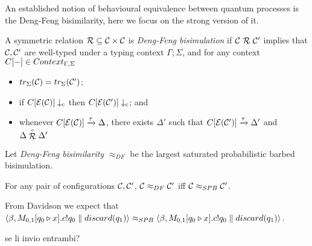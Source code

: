 An established notion of behavioural equivalence between quantum processes is the Deng-Feng bisimilarity, here we focus on the strong version of it.
\begin{definition}
	A symmetric relation $\mathcal{R} \subseteq \mathcal{C} \times \mathcal{C}$ is \emph{Deng-Feng bisimulation} if $\mathcal{C}\ \mathcal{R}\ \mathcal{C}'$ implies that $\mathcal{C}, \mathcal{C}'$ are well-typed under a typing context $\Gamma; \Sigma$, and for any context $C[{-}] \in Context_{\Gamma, \Sigma}$
	\begin{itemize}
		\item $tr_{\Sigma}(\mathcal{C}) = tr_{\Sigma}(\mathcal{C}')$;
		\item if $C[\mathcal{E}(\mathcal{C})] \downarrow_{c}$ then $C[\mathcal{E}(\mathcal{C}')] \downarrow_{c}$; and
		\item whenever $C[\mathcal{E}(\mathcal{C})] \xrightarrow{\tau} \Delta$, there exists $\Delta'$ such that $C[\mathcal{E}(\mathcal{C}')] \xrightarrow{\tau} \Delta'$ and $\Delta \stackrel{\scriptscriptstyle \circ}{\mathcal{R}} \Delta'$
	\end{itemize}
	Let \emph{Deng-Feng bisimilarity} $\approx_{DF}$ be the largest saturated probabilistic barbed bisimulation.
\end{definition}

\begin{theorem}
	For any pair of configurations $\mathcal{C}, \mathcal{C}'$, $\mathcal{C} \approx_{DF} \mathcal{C}'$ iff $\mathcal{C} \approx_{SPB} \mathcal{C}'$.
\end{theorem}


From Davidson we expect that $\langle\beta, M_{0,1}[q_0 \triangleright x] . c ! q_0 \parallel discard(q_1)\rangle \approx_{SPB} \langle\beta, M_{0,1}[q_0 \triangleright x] . c ! q_0 \parallel discard(q_1)\rangle$.

{\color{red} se li invio entrambi?}

